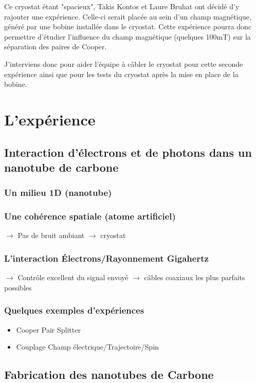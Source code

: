 \documentclass[a4paper,11pt]{report}
\begin{document}
Ce cryostat étant "spacieux", Takis Kontos et Laure Bruhat ont décidé d'y rajouter une expérience. Celle-ci serait placée au sein d'un champ magnétique, généré par une bobine installée dans le cryostat. Cette expérience pourra donc permettre d'étudier l'influence du champ magnétique (quelques 100mT) sur la séparation des paires de Cooper.

J'interviens donc pour aider l'équipe à câbler le cryostat pour cette seconde expérience ainsi que pour les tests du cryostat après la mise en place de la bobine.


\chapter{L'expérience}

\section{Interaction d'électrons et de photons dans un nanotube de carbone}
\subsection{Un milieu 1D (nanotube)}

\subsection{Une cohérence spatiale (atome artificiel)}
$\rightarrow$ Pas de bruit ambiant $\rightarrow$ cryostat

\subsection{L'interaction Électrons/Rayonnement Gigahertz}
$\rightarrow$ Contrôle excellent du signal envoyé $\rightarrow$ câbles coaxiaux les plus parfaits possibles

\subsection{Quelques exemples d'expériences}
\begin{itemize}
    \item Cooper Pair Splitter
    \item Couplage Champ électrique/Trajectoire/Spin
\end{itemize}

\section{Fabrication des nanotubes de Carbone}
\end{document}
